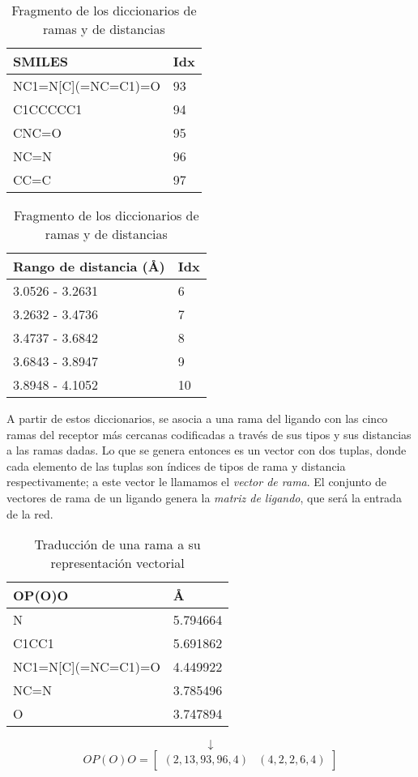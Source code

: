 \begin{table}[H]
  \begin{center}
    \begin{tabular}{l|l}
      SMILES                 & Idx \\ \hline
      NC1=N{[}C{]}(=NC=C1)=O & 93 \\
      C1CCCCC1               & 94 \\
      CNC=O                  & 95 \\
      NC=N                   & 96 \\
      CC=C                   & 97
    \end{tabular}
    \begin{tabular}{l|l}
      Rango de distancia (\AA) & Idx \\ \hline
      3.0526 - 3.2631        & 6   \\
      3.2632 - 3.4736        & 7   \\
      3.4737 - 3.6842        & 8   \\
      3.6843 - 3.8947        & 9   \\
      3.8948 - 4.1052        & 10
    \end{tabular}
  \end{center}
  \caption{Fragmento de los diccionarios de ramas y de distancias}
  \label{fig:dictionary}
\end{table}

A partir de estos diccionarios, se asocia a una rama del ligando con
las cinco ramas del receptor más cercanas codificadas a través de sus
tipos y sus distancias a las ramas dadas. Lo que se genera entonces es
un vector con dos tuplas, donde cada elemento de las tuplas son
índices de tipos de rama y distancia respectivamente; a este vector le
llamamos el \textit{vector de rama}. El conjunto de vectores de rama
de un ligando genera la \textit{matriz de ligando}, que será la
entrada de la red.

\begin{table}[H]
  \begin{center}
  \begin{tabular}{l|l}
    OP(O)O & \AA \\ \hline N & 5.794664 \\ C1CC1 & 5.691862
    \\ NC1=N{[}C{]}(=NC=C1)=O & 4.449922 \\ NC=N & 3.785496 \\ O &
    3.747894
  \end{tabular}
  \end{center}
  \begin{equation*}
  \downarrow
  \end{equation*}
  \begin{equation*}
    OP(O)O=\begin{bmatrix}
    (2, 13, 93, 96, 4) & (4, 2, 2, 6, 4)
    \end{bmatrix}
  \end{equation*}
  \caption{Traducción de una rama a su representación vectorial}
\end{table}

